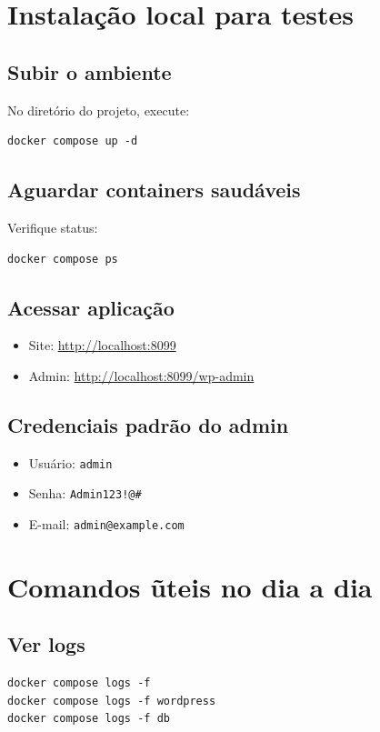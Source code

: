 ﻿\documentclass[12pt,a4paper]{article}
\begin{document}
\section{Instala\c{c}\~ao local para testes}
\subsection{Subir o ambiente}
No diret\'orio do projeto, execute:
\begin{verbatim}
docker compose up -d
\end{verbatim}

\subsection{Aguardar containers saud\'aveis}
Verifique status:
\begin{verbatim}
docker compose ps
\end{verbatim}

\subsection{Acessar aplica\c{c}\~ao}
\begin{itemize}
  \item Site: \url{http://localhost:8099}
  \item Admin: \url{http://localhost:8099/wp-admin}
\end{itemize}

\subsection{Credenciais padr\~ao do admin}
\begin{itemize}
  \item Usu\'ario: \texttt{admin}
  \item Senha: \texttt{Admin123!@\#}
  \item E-mail: \texttt{admin@example.com}
\end{itemize}

\section{Comandos \~uteis no dia a dia}
\subsection{Ver logs}
\begin{verbatim}
docker compose logs -f
docker compose logs -f wordpress
docker compose logs -f db
\end{verbatim}
\end{document}
